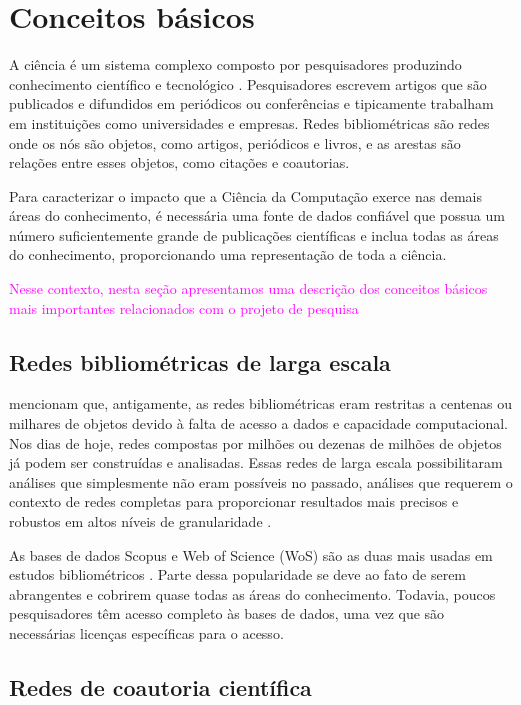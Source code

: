 \chapter[Conceitos básicos]{Conceitos básicos}

A ciência é um sistema complexo composto por pesquisadores produzindo conhecimento científico e tecnológico \cite{boyack2019creation}. Pesquisadores escrevem artigos que são publicados e difundidos em periódicos ou conferências e tipicamente trabalham em instituições como universidades e empresas. Redes bibliométricas são redes onde os nós são objetos, como artigos, periódicos e livros, e as arestas são relações entre esses objetos, como citações e coautorias.

Para caracterizar o impacto que a Ciência da Computação exerce nas demais áreas do conhecimento, é necessária uma fonte de dados confiável que possua um número suficientemente grande de publicações científicas e inclua todas as áreas do conhecimento, proporcionando uma representação de toda a ciência.

\textcolor{magenta}{
Nesse contexto, nesta seção apresentamos uma descrição dos conceitos básicos mais importantes relacionados com o projeto de pesquisa}


\section{Redes bibliométricas de larga escala}

 mencionam que, antigamente, as redes bibliométricas eram restritas a centenas ou milhares de objetos devido à falta de acesso a dados e capacidade computacional. Nos dias de hoje, redes compostas por milhões ou dezenas de milhões de objetos já podem ser construídas e analisadas. Essas redes de larga escala possibilitaram análises que simplesmente não eram possíveis no passado, análises que requerem o contexto de redes completas para proporcionar resultados mais precisos e robustos em altos níveis de granularidade \cite{boyack2019creation}.

As bases de dados Scopus e Web of Science (WoS) são as duas mais usadas em estudos bibliométricos \cite{boyack2019creation}. Parte dessa popularidade se deve ao fato de serem abrangentes e cobrirem quase todas as áreas do conhecimento. Todavia, poucos pesquisadores têm acesso completo às bases de dados, uma vez que são necessárias licenças específicas para o acesso.


\section{Redes de coautoria científica}

